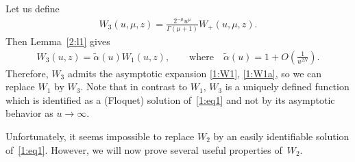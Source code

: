 \documentclass[pdftex]{sigma}
\numberwithin{equation}{section}
\begin{document}
Let us def\/ine
\begin{gather*}%
W_3(u,\mu,z)= \frac{2^{-\mu}u^\mu}{\Gamma(\mu+1)}W_+(u,\mu,z) .
\end{gather*}
Then Lemma~\ref{2:l1} gives
\begin{gather*}%
 W_3(u,z)=\tilde\alpha(u) W_1(u,z),\qquad \text{where} \quad \tilde\alpha(u)=1+O\left(\frac1{u^{2N}}\right).
\end{gather*}
Therefore, $W_3$ admits the asymptotic expansion \eqref{1:W1}, \eqref{1:W1a}, so we can replace $W_1$ by $W_3$.
Note that in contrast to $W_1$, $W_3$ is a uniquely def\/ined function which is identif\/ied as a (Floquet) solution of~\eqref{1:eq1} and not by its asymptotic behavior as $u\to\infty$.

Unfortunately, it seems impossible to replace $W_2$ by an easily identif\/iable solution of~\eqref{1:eq1}. However, we will now prove several useful properties of~$W_2$.
\end{document}
